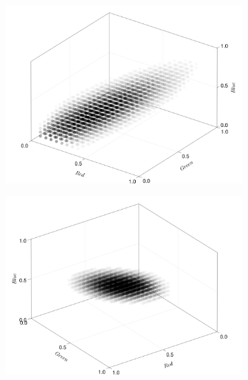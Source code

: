 \begin{figure}[ht!]
    \centering
    \begin{subfigure}[c]{0.3\textwidth}
        \centering
        \includegraphics[scale=0.09]{../pictures/gaussian_cloud_kids_1}
    \end{subfigure}
    \begin{subfigure}[c]{0.3\textwidth}
        \centering
        \includegraphics[scale=0.09]{../pictures/gaussian_cloud_kids_2}
    \end{subfigure}
    \begin{subfigure}[c]{0.3\textwidth}
        \centering

\end{subfigure}
\end{figure}
